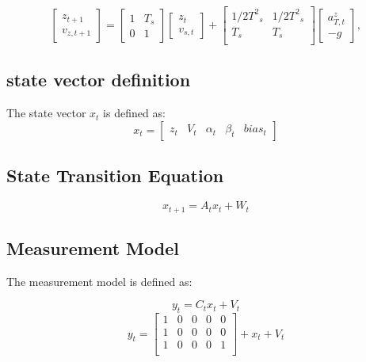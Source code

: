 \documentclass{article}
\begin{document}
\begin{equation}
\begin{bmatrix}
z_{t+1}\\
v_{z,t+1}
\end{bmatrix} =
\begin{bmatrix}
1 & T_s \\
0 & 1 
\end{bmatrix}
\begin{bmatrix}
z_t\\
v_{s,t}
\end{bmatrix} + 
\begin{bmatrix}
{1/2}{T^2}_s & {1/2}{T^2}_s \\
T_s & T_s \\ 
\end{bmatrix}
\begin{bmatrix}
a_{T,t}^z \\ 
-g
\end{bmatrix},
\end{equation}
\subsection{state vector definition}
The state vector \( x_t \) is defined as:
\begin{equation}
    x_t = 
    \begin{bmatrix}
        z_t &
        V_{t} & 
        \alpha_t & 
        \beta_t &
        bias_t 
    \end{bmatrix}
\end{equation}

\subsection{State Transition Equation}
\begin{equation}
    {x}_{t+1} = A_t {x}_t + W_t
\end{equation}

\subsection{Measurement Model}
The measurement model is defined as:

\begin{equation}
y_t = C_t x_t + V_t
\end{equation}
\begin{equation}
    y_t  = 
    \begin{bmatrix}
        1 & 0 & 0 & 0 & 0 \\
        1 & 0 & 0 & 0 & 0 \\
        1 & 0 & 0 & 0 & 1 \\
    \end{bmatrix}
    + x_t + V_t
\end{equation}
\\
\end{document}
